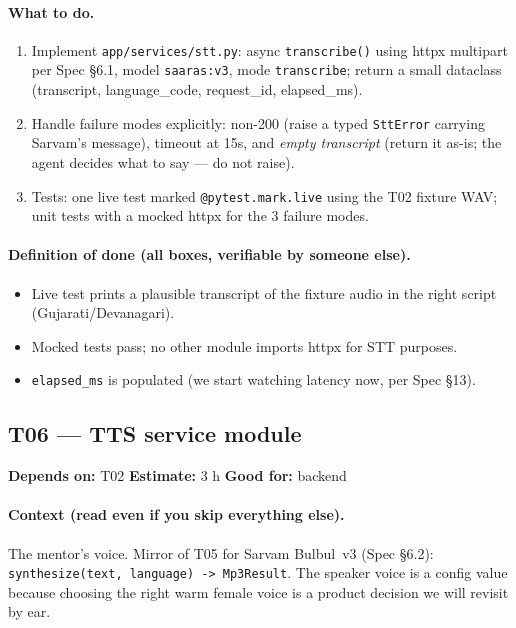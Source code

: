 \documentclass[11pt]{article}
\newcommand{\code}[1]{\texttt{#1}}
\newcommand{\taskmeta}[3]{\noindent\textbf{Depends on:} #1 \quad\textbullet\quad \textbf{Estimate:} #2 \quad\textbullet\quad \textbf{Good for:} #3\par\vspace{2pt}}
\newcommand{\ctx}[1]{\paragraph{Context (read even if you skip everything else).} #1}
\newcommand{\dod}{\paragraph{Definition of done (all boxes, verifiable by someone else).}}
\begin{document}
\paragraph{What to do.}
\begin{enumerate}
  \item Implement \code{app/services/stt.py}: async \code{transcribe()} using httpx multipart per Spec \S6.1, model \code{saaras:v3}, mode \code{transcribe}; return a small dataclass (transcript, language\_code, request\_id, elapsed\_ms).
  \item Handle failure modes explicitly: non-200 (raise a typed \code{SttError} carrying Sarvam's message), timeout at 15s, and \emph{empty transcript} (return it as-is; the agent decides what to say --- do not raise).
  \item Tests: one live test marked \code{@pytest.mark.live} using the T02 fixture WAV; unit tests with a mocked httpx for the 3 failure modes.
\end{enumerate}
\dod
\begin{itemize}
  \item Live test prints a plausible transcript of the fixture audio in the right script (Gujarati/Devanagari).
  \item Mocked tests pass; no other module imports httpx for STT purposes.
  \item \code{elapsed\_ms} is populated (we start watching latency now, per Spec \S13).
\end{itemize}

\subsection{T06 --- TTS service module \dag}
\taskmeta{T02}{3 h}{backend}
\ctx{The mentor's voice. Mirror of T05 for Sarvam Bulbul~v3 (Spec \S6.2): \code{synthesize(text, language) -> Mp3Result}. The speaker voice is a config value because choosing the right warm female voice is a product decision we will revisit by ear.}
\end{document}
